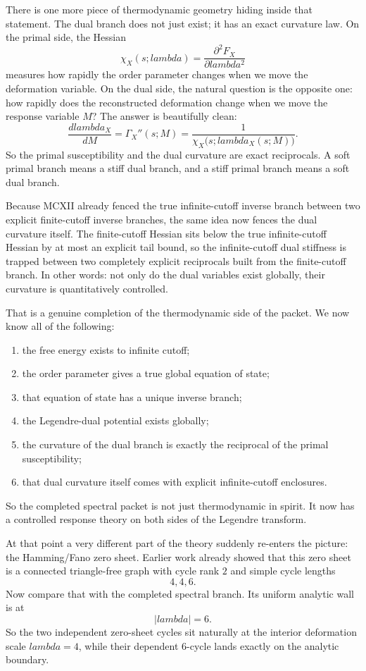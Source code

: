 \documentclass[11pt]{article}
\def\mathcal#1{#1}%
\def\lambda{lambda}%
\begin{document}
There is one more piece of thermodynamic geometry hiding inside that statement. The dual branch does not just exist; it has an exact curvature law. On the primal side, the Hessian
\[
\chi_X(s;\lambda)=\frac{\partial^2 \mathcal F_X}{\partial\lambda^2}
\]
measures how rapidly the order parameter changes when we move the deformation variable. On the dual side, the natural question is the opposite one: how rapidly does the reconstructed deformation change when we move the response variable $M$? The answer is beautifully clean:
\[
\frac{d\lambda_X}{dM}=\Gamma_X''(s;M)=\frac{1}{\chi_X\bigl(s;\lambda_X(s;M)\bigr)}.
\]
So the primal susceptibility and the dual curvature are exact reciprocals. A soft primal branch means a stiff dual branch, and a stiff primal branch means a soft dual branch.

Because MCXII already fenced the true infinite-cutoff inverse branch between two explicit finite-cutoff inverse branches, the same idea now fences the dual curvature itself. The finite-cutoff Hessian sits below the true infinite-cutoff Hessian by at most an explicit tail bound, so the infinite-cutoff dual stiffness is trapped between two completely explicit reciprocals built from the finite-cutoff branch. In other words: not only do the dual variables exist globally, their curvature is quantitatively controlled.

That is a genuine completion of the thermodynamic side of the packet. We now know all of the following:
\begin{enumerate}
\item the free energy exists to infinite cutoff;
\item the order parameter gives a true global equation of state;
\item that equation of state has a unique inverse branch;
\item the Legendre-dual potential exists globally;
\item the curvature of the dual branch is exactly the reciprocal of the primal susceptibility;
\item that dual curvature itself comes with explicit infinite-cutoff enclosures.
\end{enumerate}
So the completed spectral packet is not just thermodynamic in spirit. It now has a controlled response theory on both sides of the Legendre transform.

At that point a very different part of the theory suddenly re-enters the picture: the Hamming/Fano zero sheet. Earlier work already showed that this zero sheet is a connected triangle-free graph with cycle rank $2$ and simple cycle lengths
\[
4,4,6.
\]
Now compare that with the completed spectral branch. Its uniform analytic wall is at
\[
|\lambda|=6.
\]
So the two independent zero-sheet cycles sit naturally at the interior deformation scale $\lambda=4$, while their dependent $6$-cycle lands exactly on the analytic boundary.
\end{document}
